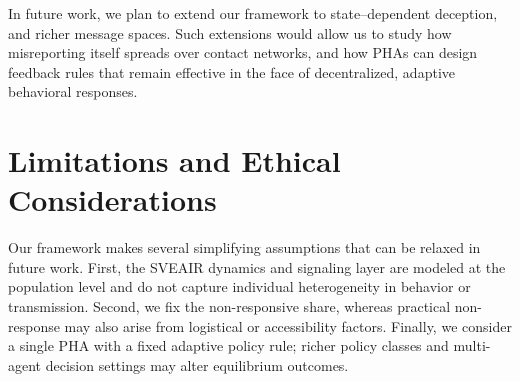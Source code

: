 \documentclass[sigconf,review]{acmart}
\newcommand{\ys}[1]{\textcolor{red}{[YS: #1]}}
\begin{document}
In future work, we plan to extend our framework to state--dependent deception, and richer message spaces. %
Such extensions would allow us to study how misreporting itself spreads over contact networks, and how PHAs can design feedback rules that remain effective in the face of decentralized, adaptive behavioral responses.









\section*{Limitations and Ethical Considerations}

Our framework makes several simplifying assumptions that can be relaxed in future work. First, the SVEAIR dynamics and signaling layer are modeled at the population level and do not capture individual heterogeneity in behavior or transmission. Second, we fix the non-responsive share, whereas practical non-response may also arise from logistical or accessibility factors. Finally, we consider a single PHA with a fixed adaptive policy rule; richer policy classes and multi-agent decision settings may alter equilibrium outcomes.
\end{document}
